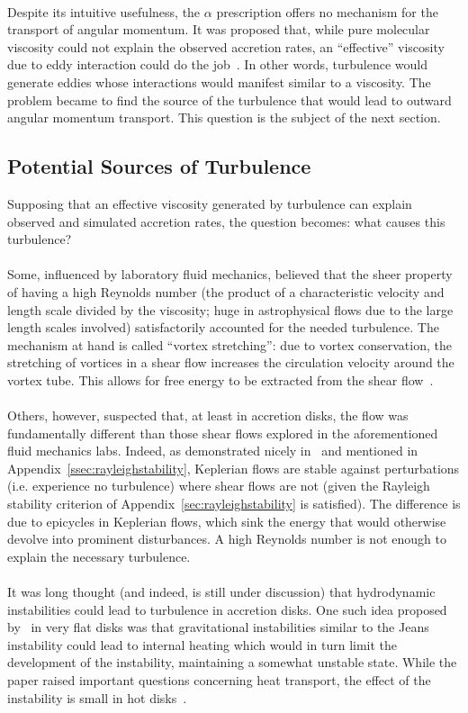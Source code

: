 \\
Despite its intuitive usefulness, the $\alpha$ prescription offers no mechanism for the transport of angular momentum. It was proposed that, while pure molecular viscosity could not explain the observed accretion rates, an ``effective'' viscosity due to eddy interaction could do the job~\cite{BH1998}. In other words, turbulence would generate eddies whose interactions would manifest similar to a viscosity. The problem became to find the source of the turbulence that would lead to outward angular momentum transport. This question is the subject of the next section.

\subsection{Potential Sources of Turbulence}
Supposing that an effective viscosity generated by turbulence can explain observed and simulated accretion rates, the question becomes: what causes this turbulence? \\
\\
Some, influenced by laboratory fluid mechanics, believed that the sheer property of having a high Reynolds number (the product of a characteristic velocity and length scale divided by the viscosity; huge in astrophysical flows due to the large length scales involved) satisfactorily accounted for the needed turbulence. The mechanism at hand is called ``vortex stretching'': due to vortex conservation, the stretching of vortices in a shear flow increases the circulation velocity around the vortex tube. This allows for free energy to be extracted from the shear flow~\cite{BH1998}.\\
\\
Others, however, suspected that, at least in accretion disks, the flow was fundamentally different than those shear flows explored in the aforementioned fluid mechanics labs. Indeed, as demonstrated nicely in~\cite{BH1998} and mentioned in Appendix~\ref{ssec:rayleighstability}, Keplerian flows are stable against perturbations (i.e. experience no turbulence) where shear flows are not (given the Rayleigh stability criterion of Appendix~\ref{sec:rayleighstability} is satisfied). The difference is due to epicycles in Keplerian flows, which sink the energy that would otherwise devolve into prominent disturbances. A high Reynolds number is not enough to explain the necessary turbulence.\\
\\
It was long thought (and indeed, is still under discussion) that hydrodynamic instabilities could lead to turbulence in accretion disks. One such idea proposed by~\citet{Paczynski1978} in very flat disks was that gravitational instabilities similar to the Jeans instability could lead to internal heating which would in turn limit the development of the instability, maintaining a somewhat unstable state. While the paper raised important questions concerning heat transport, the effect of the instability is small in hot disks~\cite{Spruit2009}.\\
